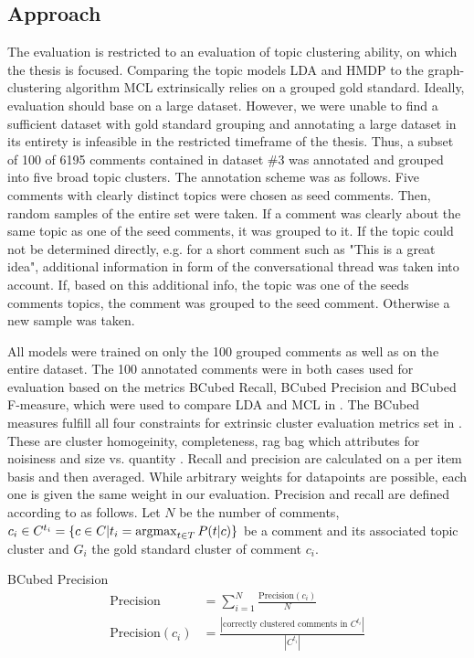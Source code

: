 \subsection{Approach}
\label{evalapproach}
The evaluation is restricted to an evaluation of topic clustering ability, on which the thesis is focused. Comparing the topic models LDA and HMDP to the graph-clustering algorithm MCL extrinsically relies on a grouped gold standard.
Ideally, evaluation should base on a large dataset. However, we were unable to find a sufficient dataset with gold standard grouping and annotating a large dataset in its entirety is infeasible in the restricted timeframe of the thesis. Thus, a subset of 100 of 6195 comments contained in dataset \#3 was annotated and grouped into five broad topic clusters. The annotation scheme was as follows. Five comments with clearly distinct topics were chosen as seed comments. Then, random samples of the entire set were taken. If a comment was clearly about the same topic as one of the seed comments, it was grouped to it. If the topic could not be determined directly, e.g. for a short comment such as "This is a great idea", additional information in form of the conversational thread was taken into account. If, based on this additional info, the topic was one of the seeds comments topics, the comment was grouped to the seed comment. Otherwise a new sample was taken. \par
All models were trained on only the 100 grouped comments as well as on the entire dataset. The 100 annotated comments were in both cases used for evaluation based on the metrics BCubed Recall, BCubed Precision and BCubed F-measure, which were used to compare LDA and MCL in \cite{DBLP:conf/ecir/AkerKBPBHG16}. The BCubed measures fulfill all four constraints for extrinsic cluster evaluation metrics set in \cite{DBLP:journals/ir/AmigoGAV09}. These are cluster homogeinity, completeness, rag bag which attributes for noisiness and size vs. quantity \cite{DBLP:journals/ir/AmigoGAV09}. Recall and precision are calculated on a per item basis and then averaged. While arbitrary weights for datapoints are possible, each one is given the same weight in our evaluation. Precision and recall are defined according to \cite{Bagga98algorithmsfor} as follows. Let $N$ be the number of comments, $c_i \in C^{t_i} = \{c \in C|t_i = \operatorname*{argmax}_{t \in T} P(t|c)\}$ be a comment and its associated topic cluster and $G_i$ the gold standard cluster of comment $c_i$.
\begin{definition}{BCubed Precision}
\begin{align}
\text{Precision} &= \sum_{i=1}^N \frac{\text{Precision}(c_i)}{N} \\
\text{Precision}(c_i) &= \frac{|\text{correctly clustered comments in }C^{t_i}|}{|C^{t_i}|}
\end{align}
\end{definition}
